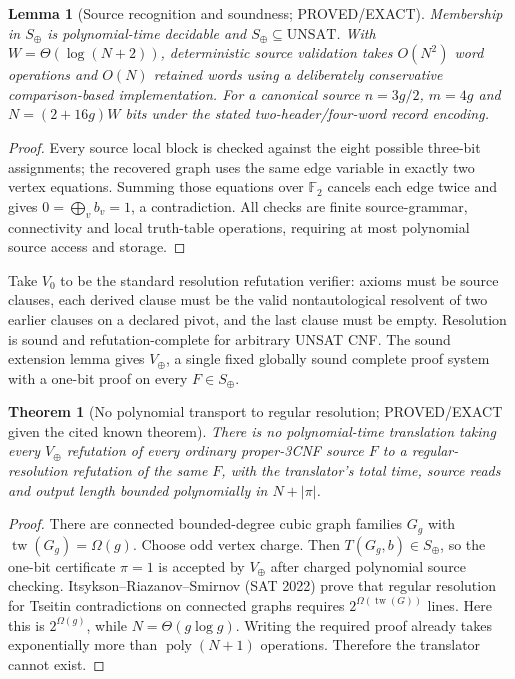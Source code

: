\documentclass[11pt]{article}
\newtheorem{theorem}{Theorem}
\newtheorem{lemma}{Lemma}
\begin{document}
\begin{lemma}[Source recognition and soundness; PROVED/EXACT]
Membership in $S_{\oplus}$ is polynomial-time decidable and
$S_{\oplus}\subseteq\mathrm{UNSAT}$. With $W=\Theta(\log(N+2))$,
deterministic source validation takes $O(N^2)$ word operations
and $O(N)$ retained words using a deliberately conservative
comparison-based implementation.
For a canonical source $n=3g/2$, $m=4g$ and
$N=(2+16g)W$ bits under the stated two-header/four-word record encoding.
\end{lemma}
\begin{proof}
Every source local block is checked against the eight possible
three-bit assignments; the recovered graph uses the same
edge variable in exactly two vertex equations. Summing those
equations over $\mathbb F_2$ cancels each edge twice and gives
$0=\bigoplus_v b_v=1$, a contradiction. All checks are finite
source-grammar, connectivity and local truth-table operations,
requiring at most polynomial source access and storage.
\end{proof}

Take $V_0$ to be the standard resolution refutation verifier:
axioms must be source clauses, each derived clause must be the
valid nontautological resolvent of two earlier clauses on a
declared pivot, and the last clause must be empty. Resolution
is sound and refutation-complete for arbitrary UNSAT CNF.
The sound extension lemma gives $V_{\oplus}$, a single fixed
globally sound complete proof system with a one-bit proof
on every $F\in S_{\oplus}$.

\begin{theorem}[No polynomial transport to regular resolution;
PROVED/EXACT given the cited known theorem]
There is no polynomial-time translation taking every
$V_{\oplus}$ refutation of every ordinary proper-3CNF source
$F$ to a \emph{regular-resolution} refutation of the same $F$,
with the translator's total time, source reads and output
length bounded polynomially in $N+|\pi|$.
\end{theorem}
\begin{proof}
There are connected bounded-degree cubic graph families
$G_g$ with $\operatorname{tw}(G_g)=\Omega(g)$.
Choose odd vertex charge. Then $T(G_g,b)\in S_{\oplus}$,
so the one-bit certificate $\pi=1$ is accepted by
$V_{\oplus}$ after charged polynomial source checking.
Itsykson--Riazanov--Smirnov (SAT 2022) prove that regular
resolution for Tseitin contradictions on connected graphs
requires $2^{\Omega(\operatorname{tw}(G))}$ lines.
Here this is $2^{\Omega(g)}$, while
$N=\Theta(g\log g)$. Writing the required proof already
takes exponentially more than $\operatorname{poly}(N+1)$
operations. Therefore the translator cannot exist.
\end{proof}
\end{document}
